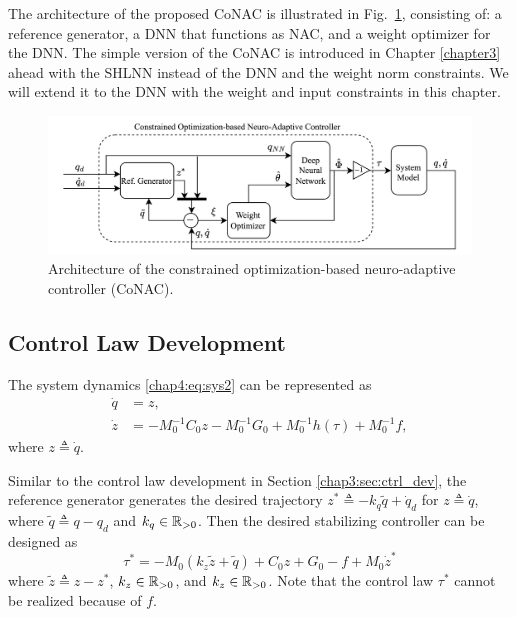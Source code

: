 The architecture of the proposed CoNAC is illustrated in Fig.~\ref{chap4:fig:ctrl}, consisting of: a reference generator, a DNN that functions as NAC, and a weight optimizer for the DNN. 
The simple version of the CoNAC is introduced in Chapter \ref{chapter3} ahead with the SHLNN instead of the DNN and the weight norm constraints.
We will extend it to the DNN with the weight and input constraints in this chapter.

\begin{figure}[t]
    \centering
    \includegraphics[width=0.9\linewidth]{imgs/ControllerChap4.drawio.png}
    \caption{Architecture of the constrained optimization-based neuro-adaptive controller (CoNAC).}
    \label{chap4:fig:ctrl}
\end{figure}

\subsection{Control Law Development}

The system dynamics \eqref{chap4:eq:sys2} can be represented as
\begin{equation}
    \begin{aligned}
        \dot {q} &= {z},\\
        \dot {z} &= -M_0^{-1} C_0 {z}-M_0^{-1} G_0+M_0^{-1} h(\tau) + M_0^{-1} f,
    \end{aligned}
    \label{chap4:eq:x_dyna}
\end{equation}
where ${z}\triangleq \dot q$.

Similar to the control law development in Section \ref{chap3:sec:ctrl_dev}, the reference generator generates the desired trajectory $z^*\triangleq -k_q\tilde q+\dot q_d$ for $z\triangleq \dot q$, where $\tilde q\triangleq q-q_d$ and $k_q\in\mathbb{R}_{>0}$.
Then the desired stabilizing controller can be designed as
\begin{equation}
    \tau^* = -M_0(k_z\tilde z+\tilde q)+C_0 z+G_0-f+M_0\dot z^*
    \label{chap4:eq:desired_control}
\end{equation}
where $\tilde z\triangleq z-z^*$, $k_z\in\mathbb{R}_{>0}$, and $k_z\in\mathbb{R}_{>0}$.
Note that the control law $\tau^*$ cannot be realized because of $f$.

